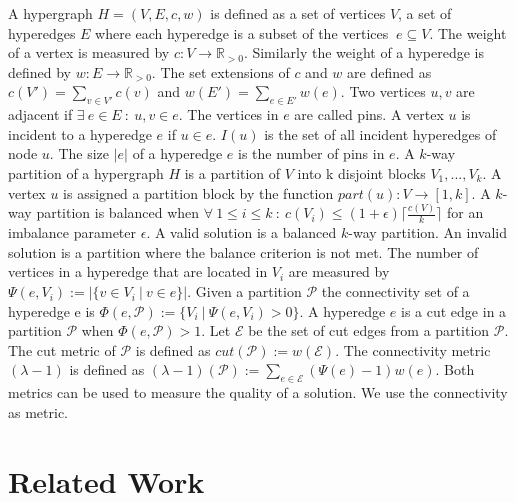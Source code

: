 \documentclass[a4paper,12pt,titlepage, BCOR7mm,headsepline]{scrbook}
\numberwithin{equation}{section}
\begin{document}
A hypergraph $H = (V, E, c, w)$ is defined as a set of vertices $V$, a set of hyperedges $E$ where each hyperedge is a subset of the vertices $\ e \subseteq V$.
The weight of a vertex is measured by $c: V \rightarrow  \mathbb R_{> 0}$. Similarly the weight of a hyperedge is defined by $w: E \rightarrow  \mathbb R_{> 0}$. 
The set extensions of $c$ and $w$ are defined as $c(V') = \sum_{v \in V'} c(v)$ and $w(E') = \sum_{e \in E'} w(e)$. 
Two vertices $u, v$ are adjacent if $\exists\ e \in E\ :\ u, v \in e$. The vertices in $e$ are called pins. A vertex $u$ is incident to a hyperedge $e$ if $ u \in e$. $I(u)$ is the set of all incident hyperedges of node $u$. The size $|e|$ of a hyperedge $e$ is the number of pins in $e$. A $k$-way partition of a hypergraph $H$ is a partition of $V$ into k disjoint blocks $V_1, ..., V_k$. A vertex $u$ is assigned a partition block by the function $part(u): V \rightarrow [1, k]$.
A $k$-way partition is balanced when $\forall\  1 \le i \le k\ :\ c(V_i) \le (1 + \epsilon) \lceil \frac{c(V)}{k} \rceil $ for an imbalance parameter $\epsilon$.
A valid solution is a balanced $k$-way partition. An invalid solution is a partition where the balance criterion is not met.
The number of vertices in a hyperedge that are located in $V_i$ are measured by $\Psi(e,V_i) := |\{v \in V_i \ |\ v \in e \}|$. Given a partition $\mathcal{P}$ the connectivity set of a hyperedge e is $\Phi(e, \mathcal{P}) :=  \{V_i\ |\ \Psi(e, V_i) > 0\}$. 
A hyperedge $e$ is a cut edge in a partition $\mathcal{P}$ when $\Phi(e, \mathcal{P}) > 1$. 
Let $\mathcal{E}$ be the set of cut edges from a partition $\mathcal{P}$. The cut metric of $\mathcal{P}$ is defined as $cut(\mathcal{P}) := w(\mathcal{E})$.
The connectivity metric $(\lambda - 1)$ is defined as $(\lambda - 1)(\mathcal{P}) := \sum_{e \in \mathcal{E}}(\Psi(e) - 1)w(e)$.
Both metrics can be used to measure the quality of a solution. We use the connectivity as metric. 





\section{Related Work}
\end{document}
